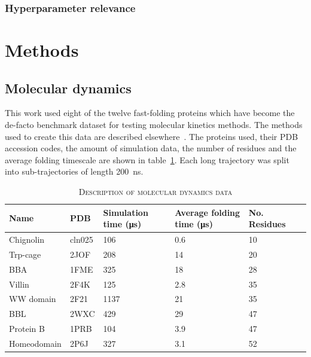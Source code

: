 \documentclass[journal=jacsat,manuscript=article]{achemso}
\begin{document}
\subsubsection{Hyperparameter relevance}



\section{Methods}
\subsection{Molecular dynamics}

This work used eight of the twelve fast-folding proteins which have become the de-facto benchmark dataset for testing molecular kinetics methods. The methods used to create this data are described elsewhere~\cite{lindorff-larsen_how_2011}. The proteins used, their PDB accession codes, the amount of simulation data, the number of residues and the average folding timescale are shown in table~\ref{tab:data_description}. Each long trajectory was split into sub-trajectories of length \SI{200}{\nano\second}. 

\begin{table}
    \caption{\textsc{Description of molecular dynamics data}}
    \begin{tabularx}{\textwidth}{llXXXX}
    \toprule
    Name & PDB & Simulation time (\si{\micro\second}) & Average folding time (\si{\micro\second}) & No. Residues & \\
    \midrule
    Chignolin           & cln025    & \num{106}     & \num{0.6} & 10 & \\
    Trp-cage            & 2JOF      & \num{208}     & \num{14}  & 20 & \\
    BBA                 & 1FME      & \num{325}     & \num{18}  & 28 & \\
    Villin              & 2F4K      & \num{125}     & \num{2.8} & 35  &\\
    WW domain           & 2F21      & \num{1137}    & \num{21}  & 35 & \\
    BBL                 & 2WXC      & \num{429}     & \num{29}  & 47  &\\
    Protein B           & 1PRB      & \num{104}     & \num{3.9} & 47 & \\
    Homeodomain         & 2P6J      & \num{327}     & \num{3.1} & 52 & \\
    \bottomrule
    \end{tabularx}
    \label{tab:data_description}
\end{table}
\end{document}
